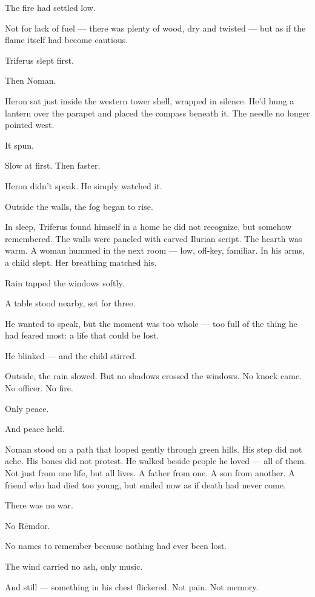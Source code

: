 \documentclass[9pt]{article}
\begin{document}
The fire had settled low.

Not for lack of fuel — there was plenty of wood, dry and twisted — but as if the flame itself had become cautious.

Triferus slept first.

Then Noman.

Heron sat just inside the western tower shell, wrapped in silence. He’d hung a lantern over the parapet and placed the compass beneath it. The needle no longer pointed west.

It spun.

Slow at first. Then faster.

Heron didn’t speak. He simply watched it.

Outside the walls, the fog began to rise.

\bigskip

In sleep, Triferus found himself in a home he did not recognize, but somehow remembered. The walls were paneled with carved Ilurian script. The hearth was warm. A woman hummed in the next room — low, off-key, familiar. In his arms, a child slept. Her breathing matched his.

Rain tapped the windows softly.

A table stood nearby, set for three.

He wanted to speak, but the moment was too whole — too full of the thing he had feared most: a life that could be lost.

He blinked — and the child stirred.

Outside, the rain slowed. But no shadows crossed the windows. No knock came. No officer. No fire.

Only peace.

And peace held.

\bigskip

Noman stood on a path that looped gently through green hills. His step did not ache. His bones did not protest. He walked beside people he loved — all of them. Not just from one life, but all lives. A father from one. A son from another. A friend who had died too young, but smiled now as if death had never come.

There was no war.

No Rēmdor.

No names to remember because nothing had ever been lost.

The wind carried no ash, only music.

And still — something in his chest flickered. Not pain. Not memory.
\end{document}
